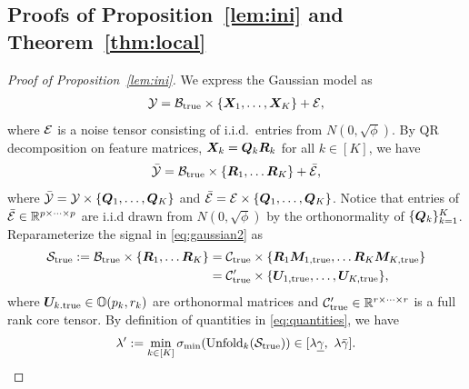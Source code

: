 \documentclass[12pt]{article}
\theoremstyle{definition}
\begin{document}
\subsection{Proofs of Proposition~\ref{lem:ini} and Theorem~\ref{thm:local}}
\begin{proof}[Proof of Proposition~\ref{lem:ini}]

We express the Gaussian model as 
\begin{align}\label{eq:gaussian}
    \mathcal{Y} = \mathcal{B}_{\text{true}}\times \{\bm X_1,\ldots,\bm X_K\} + \mathcal{E},
\end{align}
where $\mathcal{E}$ is a noise tensor consisting of i.i.d.\ entries from $N(0,\sqrt{\phi}).$ 
By QR decomposition on feature matrices, $\bm X_k = \bm{Q}_k\bm{R}_k$ for all $k\in[K]$, we have 
\begin{align}\label{eq:gaussian2}
    \bar{\mathcal{Y}} = \mathcal{B}_{\text{true}}\times\{\bm{R}_1,\ldots \bm{R}_K\}+\bar{\mathcal{E}},
\end{align}
where $\bar{\mathcal{Y}} = \mathcal{Y}\times\{\bm{Q}_1,\ldots,\bm{Q}_K\}$ and  $\bar{\mathcal{E}} = \mathcal{E}\times\{\bm{Q}_1,\ldots,\bm{Q}_K\}$.
Notice that entries of $\bar{\mathcal{E}}\in\mathbb{R}^{p\times\cdots\times p}$ are i.i.d drawn from $N(0,\sqrt{\phi})$ by the orthonormality of $\{\bm{Q}_k\}_{k=1}^K$. Reparameterize the signal in \eqref{eq:gaussian2} as 
\begin{align}\label{eq:repara}
    \mathcal{S}_{\text{true}} := \mathcal{B}_{\text{true}}\times\{\bm{R}_1,\ldots \bm{R}_K\}&=  \mathcal{C}_{\text{true}}\times\{\bm{R}_1\bm M_{1,\text{true}},\ldots \bm{R}_K\bm M_{K,\text{true}}\}\notag \\
    & = \mathcal{C}'_{\text{true}}\times\{\bm{U}_{1,\text{true}},
    \ldots,\bm{U}_{K,\text{true}}\},
\end{align}
where $\bm{U}_{k.\text{true}}\in\mathbb{O}(p_k, r_k)$ are orthonormal matrices and $\mathcal{C}'_{\text{true}}\in\mathbb{R}^{r\times \cdots\times r}$ is a full rank core tensor.
By definition of quantities in \eqref{eq:quantities}, we have
\begin{align}\label{eq:lambdas}
    \lambda' := \min_{k\in[K]}\sigma_{\min}(\text{Unfold}_k(\mathcal{S}_{\text{true}}))\in[  \lambda \underline \gamma,\ \lambda \bar \gamma].
\end{align}


\end{proof}
\end{document}
